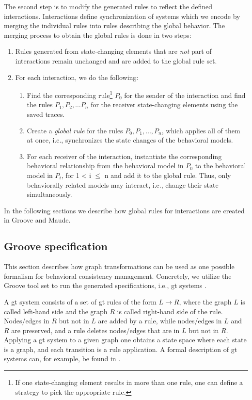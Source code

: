 \documentclass{jot}
\begin{document}
The second step is to modify the generated rules to reflect the defined interactions.
Interactions define synchronization of systems which we encode by merging the individual rules into rules describing the global behavior.
The merging process to obtain the global rules is done in two steps:

\begin{enumerate}
    \item Rules generated from state-changing elements that are \textit{not} part of interactions remain unchanged and are added to the global rule set.
    \item For each interaction, we do the following:
     \begin{enumerate}
         \item Find the corresponding rule\footnote{If one state-changing element results in more than one rule, one can define a strategy to pick the appropriate rule.} $P_0$ for the sender of the interaction and find the rules $P_1, P_2, \ldots P_n$ for the receiver state-changing elements using the saved traces.
         \item Create a \emph{global rule} for the rules $P_0, P_1, \ldots, P_n$, which applies all of them at once, i.e., synchronizes the state changes of the behavioral models.
         \item For each receiver of the interaction, instantiate the corresponding behavioral relationship from the behavioral model in $P_0$ to the behavioral model in $P_i$, for 1 < i $\leq$ n and add it to the global rule.
         Thus, only behaviorally related models may interact, i.e., change their state simultaneously.
     \end{enumerate}
\end{enumerate}

In the following sections we describe how global rules for interactions are created in Groove and Maude.


\subsection{Groove specification} 
This section describes how graph transformations can be used as one possible formalism for behavioral consistency management.
Concretely, we utilize the Groove tool set to run the generated specifications, i.e., \gls*{gt} systems \cite{rensinkGROOVESimulatorTool2004}.

A \gls*{gt} system consists of a set of \gls*{gt} rules of the form $L \to R$, where the graph $L$ is called left-hand side and the graph $R$ is called right-hand side of the rule.
Nodes/edges in $R$ but not in $L$ are added by a rule, while nodes/edges in $L$ and $R$ are preserved, and a rule deletes nodes/edges that are in $L$ but not in $R$.
Applying a \gls*{gt} system to a given graph one obtains a state space where each state is a graph, and each transition is a rule application.
A formal description of \gls*{gt} systems can, for example, be found in \cite{ehrigFundamentalsAlgebraicGraph2006}. %
\end{document}
